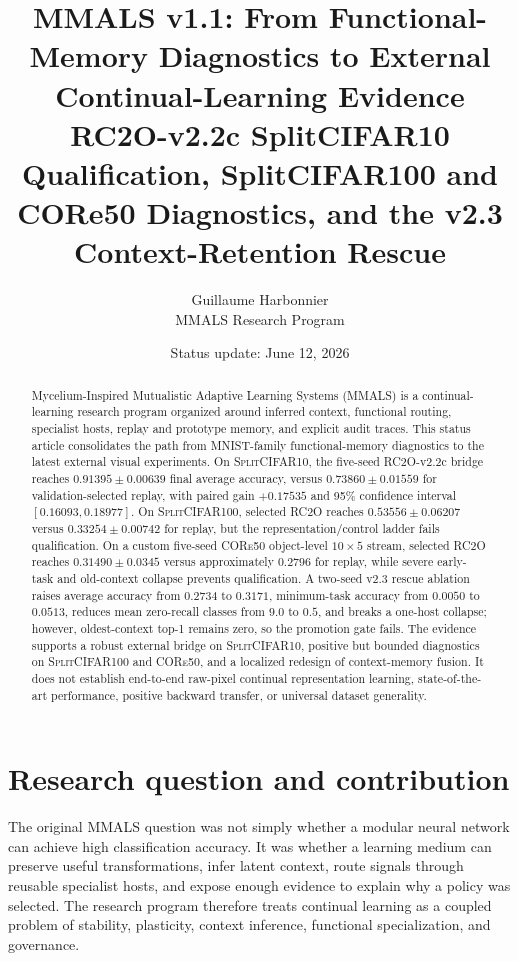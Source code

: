 \documentclass[10pt]{article}
\title{\textbf{MMALS v1.1: From Functional-Memory Diagnostics to External Continual-Learning Evidence}\\
\large RC2O-v2.2c SplitCIFAR10 Qualification, SplitCIFAR100 and CORe50 Diagnostics, and the v2.3 Context-Retention Rescue}
\author{Guillaume Harbonnier\\MMALS Research Program}
\date{Status update: June 12, 2026}
\newcommand{\mmals}{\textsc{MMALS}}
\newcommand{\rc}{\textsc{RC2O}}
\newcommand{\core}{\textsc{CORe50}}
\newcommand{\scx}{\textsc{SplitCIFAR10}}
\newcommand{\scxx}{\textsc{SplitCIFAR100}}
\begin{document}
\maketitle

\begin{abstract}
Mycelium-Inspired Mutualistic Adaptive Learning Systems (\mmals{}) is a continual-learning research program organized around inferred context, functional routing, specialist hosts, replay and prototype memory, and explicit audit traces. This status article consolidates the path from MNIST-family functional-memory diagnostics to the latest external visual experiments. On \scx{}, the five-seed \rc{}-v2.2c bridge reaches $0.91395\pm0.00639$ final average accuracy, versus $0.73860\pm0.01559$ for validation-selected replay, with paired gain $+0.17535$ and 95\% confidence interval $[0.16093,0.18977]$. On \scxx{}, selected \rc{} reaches $0.53556\pm0.06207$ versus $0.33254\pm0.00742$ for replay, but the representation/control ladder fails qualification. On a custom five-seed \core{} object-level $10\times5$ stream, selected \rc{} reaches $0.31490\pm0.0345$ versus approximately $0.2796$ for replay, while severe early-task and old-context collapse prevents qualification. A two-seed v2.3 rescue ablation raises average accuracy from $0.2734$ to $0.3171$, minimum-task accuracy from $0.0050$ to $0.0513$, reduces mean zero-recall classes from $9.0$ to $0.5$, and breaks a one-host collapse; however, oldest-context top-1 remains zero, so the promotion gate fails. The evidence supports a robust external bridge on \scx{}, positive but bounded diagnostics on \scxx{} and \core{}, and a localized redesign of context-memory fusion. It does not establish end-to-end raw-pixel continual representation learning, state-of-the-art performance, positive backward transfer, or universal dataset generality.
\end{abstract}

\section{Research question and contribution}
The original \mmals{} question was not simply whether a modular neural network can achieve high classification accuracy. It was whether a learning medium can preserve useful transformations, infer latent context, route signals through reusable specialist hosts, and expose enough evidence to explain why a policy was selected. The research program therefore treats continual learning as a coupled problem of stability, plasticity, context inference, functional specialization, and governance.
\end{document}
